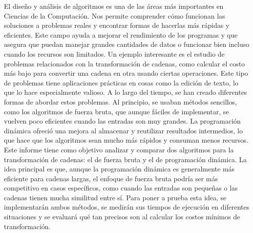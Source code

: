 
El diseño y análisis de algoritmos es una de las áreas más importantes en Ciencias de la Computación. Nos permite comprender cómo funcionan las soluciones a problemas reales y encontrar formas de hacerlas más rápidas y eficientes. Este campo ayuda a mejorar el rendimiento de los programas y que asegura que puedan manejar grandes cantidades de datos o funcionar bien incluso cuando los recursos son limitados. Un ejemplo interesante es el estudio de problemas relacionados con la transformación de cadenas, como calcular el costo más bajo para convertir una cadena en otra usando ciertas operaciones. Este tipo de problemas tiene aplicaciones prácticas en cosas como la edición de texto, lo que lo hace especialmente valioso.
\newline
A lo largo del tiempo, se han creado diferentes formas de abordar estos problemas. Al principio, se usaban métodos sencillos, como los algoritmos de fuerza bruta, que aunque fáciles de implementar, se vuelven poco eficientes cuando las entradas son muy grandes. La programación dinámica ofreció una mejora al almacenar y reutilizar resultados intermedios, lo que hace que los algoritmos sean mucho más rápidos y consuman menos recursos. 
\newline
Este informe tiene como objetivo analizar y comparar dos algoritmos para la transformación de cadenas: el de fuerza bruta y el de programación dinámica. La idea principal es que, aunque la programación dinámica es generalmente más eficiente para cadenas largas, el enfoque de fuerza bruta podría ser más competitivo en casos específicos, como cuando las entradas son pequeñas o las cadenas tienen mucha similitud entre sí. Para poner a prueba esta idea, se implementarán ambos métodos, se medirán sus tiempos de ejecución en diferentes situaciones y se evaluará qué tan precisos son al calcular los costos mínimos de transformación.